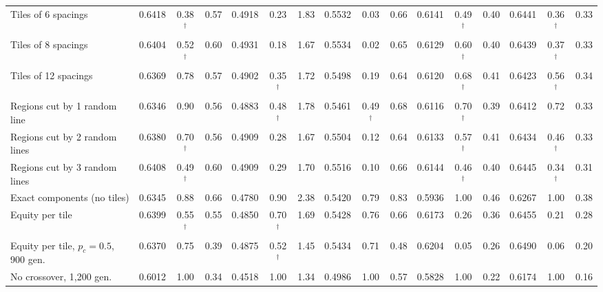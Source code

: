 \begin{table}[htbp]
{\begin{tabular}{lccccccccccccccc}
Tiles of 6 spacings & 0.6418 & 0.38$^\dagger$ & 0.57 & 0.4918 & 0.23 & 1.83 & 0.5532 & 0.03 & 0.66 & 0.6141 & 0.49$^\dagger$ & 0.40 & 0.6441 & 0.36$^\dagger$ & 0.33 \\
Tiles of 8 spacings & 0.6404 & 0.52$^\dagger$ & 0.60 & 0.4931 & 0.18 & 1.67 & 0.5534 & 0.02 & 0.65 & 0.6129 & 0.60$^\dagger$ & 0.40 & 0.6439 & 0.37$^\dagger$ & 0.33 \\
Tiles of 12 spacings & 0.6369 & 0.78 & 0.57 & 0.4902 & 0.35$^\dagger$ & 1.72 & 0.5498 & 0.19 & 0.64 & 0.6120 & 0.68$^\dagger$ & 0.41 & 0.6423 & 0.56$^\dagger$ & 0.34 \\
Regions cut by 1 random line & 0.6346 & 0.90 & 0.56 & 0.4883 & 0.48$^\dagger$ & 1.78 & 0.5461 & 0.49$^\dagger$ & 0.68 & 0.6116 & 0.70$^\dagger$ & 0.39 & 0.6412 & 0.72 & 0.33 \\
Regions cut by 2 random lines & 0.6380 & 0.70$^\dagger$ & 0.56 & 0.4909 & 0.28 & 1.67 & 0.5504 & 0.12 & 0.64 & 0.6133 & 0.57$^\dagger$ & 0.41 & 0.6434 & 0.46$^\dagger$ & 0.33 \\
Regions cut by 3 random lines & 0.6408 & 0.49$^\dagger$ & 0.60 & 0.4909 & 0.29 & 1.70 & 0.5516 & 0.10 & 0.66 & 0.6144 & 0.46$^\dagger$ & 0.40 & 0.6445 & 0.34$^\dagger$ & 0.31 \\
Exact components (no tiles) & 0.6345 & 0.88 & 0.66 & 0.4780 & 0.90 & 2.38 & 0.5420 & 0.79 & 0.83 & 0.5936 & 1.00 & 0.46 & 0.6267 & 1.00 & 0.38 \\
Equity per tile & 0.6399 & 0.55$^\dagger$ & 0.55 & 0.4850 & 0.70$^\dagger$ & 1.69 & 0.5428 & 0.76 & 0.66 & 0.6173 & 0.26 & 0.36 & 0.6455 & 0.21 & 0.28 \\
Equity per tile, $p_c = 0.5$, 900 gen. & 0.6370 & 0.75 & 0.39 & 0.4875 & 0.52$^\dagger$ & 1.45 & 0.5434 & 0.71 & 0.48 & 0.6204 & 0.05 & 0.26 & 0.6490 & 0.06 & 0.20 \\
No crossover, 1,200 gen. & 0.6012 & 1.00 & 0.34 & 0.4518 & 1.00 & 1.34 & 0.4986 & 1.00 & 0.57 & 0.5828 & 1.00 & 0.22 & 0.6174 & 1.00 & 0.16 \\
\bottomrule
\end{tabular}}
\end{table}
